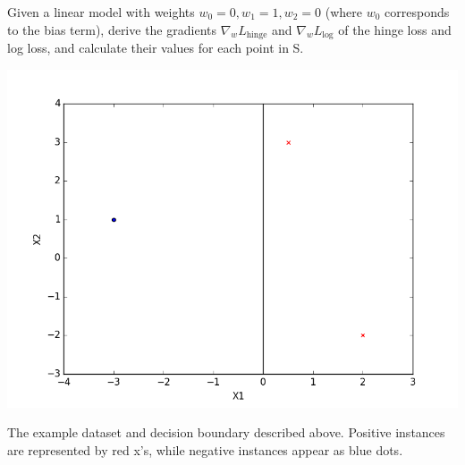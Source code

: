 Given a linear model with weights $w_0 = 0, w_1 = 1, w_2 = 0$ (where $w_0$ corresponds to the bias term), derive the gradients $\nabla_{w}L_{\text{hinge}}$ and $\nabla_{w}L_{\text{log}}$ of the hinge loss and log loss, and calculate their values for each point in S.

\begin{center}
  \includegraphics[width=.8\textwidth]{images/SimpleDatasetWithDecisionBoundary.png}
\end{center}
\begin{small}
  The example dataset and decision boundary described above. Positive instances are
  represented by red x's, while negative instances appear as blue dots.
\end{small}

